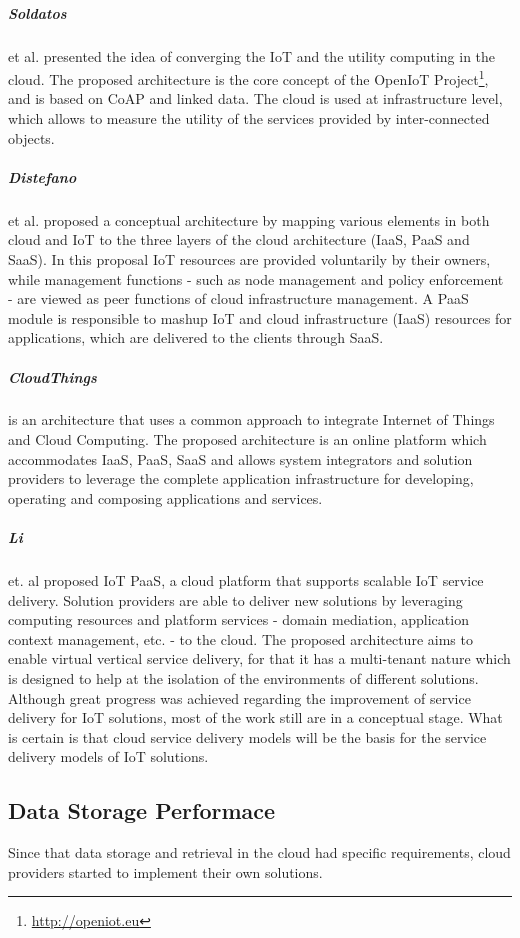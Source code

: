 \subparagraph{Soldatos} et al. \cite{soldatos2012convergence} presented the idea of converging the IoT
and the utility computing in the cloud. The proposed architecture is the core concept of the OpenIoT
Project\footnote{\url{http://openiot.eu}}, and is based on CoAP \cite{shelby2014constrained} and linked data.
The cloud is used at infrastructure level, which allows to measure the utility of the services provided
by inter-connected objects.
\subparagraph{Distefano} et al. \cite{distefano2012enabling} proposed a conceptual architecture by
mapping various elements in both cloud and IoT to the three layers of the cloud architecture (\gls{IaaS},
\gls{PaaS} and \gls{SaaS}). In this proposal IoT resources are provided voluntarily by their owners,
while management functions - such as node management and policy enforcement - are viewed as peer
functions of cloud infrastructure management. A \gls{PaaS} module is responsible to mashup IoT and
cloud infrastructure (\gls{IaaS}) resources for applications, which are delivered to the clients
through \gls{SaaS}.
\subparagraph{CloudThings} \cite{zhou2013cloudthings} is an architecture that uses a common
approach to integrate Internet of Things and Cloud Computing. The proposed architecture is an online
platform which accommodates \gls{IaaS}, \gls{PaaS}, \gls{SaaS} and allows system integrators and
solution providers to leverage the complete application infrastructure for developing, operating
and composing applications and services.
\subparagraph{Li} et. al \cite{li2013efficient} proposed IoT PaaS, a cloud platform that supports
scalable IoT service delivery. Solution providers are able to deliver new solutions by leveraging
computing resources and platform services - domain mediation, application context management, etc.
- to the cloud. The proposed architecture aims to enable virtual vertical service delivery, for that
it has a multi-tenant nature which is designed to help at the isolation of the environments of
different solutions.\\

Although great progress was achieved regarding the improvement of service delivery for \gls{IoT}
solutions, most of the work still are in a conceptual stage. What is certain is that cloud service
delivery models will be the basis for the service delivery models of \gls{IoT} solutions.

\subsection{Data Storage Performace}
\label{sub:data_storage}
Since that data storage and retrieval in the cloud had specific requirements, cloud providers started
to implement their own solutions.

